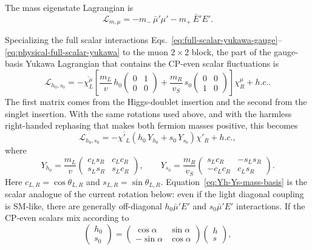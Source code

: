 \documentclass[onecolumn, aps, nofootinbib, prd, preprint, floats, floatfix, amsmath, amssymb, superscriptaddress, preprintnumbers]{revtex4-1}
\begin{document}
The mass eigenstate Lagrangian is
\begin{equation}
\mathcal{L}_{m,\mu}
=-m_-\,\bar\mu'\mu'-m_+\,\bar E' E'.
\end{equation}

Specializing the full scalar interactions Eqs.~\eqref{eq:full-scalar-yukawa-gauge}--\eqref{eq:physical-full-scalar-yukawa} to the muon $2\times2$ block, the part of the gauge-basis Yukawa Lagrangian that contains the CP-even scalar fluctuations is
\begin{equation}
\mathcal{L}_{h_0,s_0}
=-\overline{\chi_L^\mu}
\left[
\frac{m_L}{v}\,h_0
\begin{pmatrix}
0&1\\
0&0
\end{pmatrix}
+
\frac{m_R}{v_S}\,s_0
\begin{pmatrix}
0&0\\
1&0
\end{pmatrix}
\right]\chi_R^\mu
+h.c. .
\label{eq:gauge-basis-scalar-yukawa}
\end{equation}
The first matrix comes from the Higgs-doublet insertion and the second from the singlet insertion. With the same rotations used above, and with the harmless right-handed rephasing that makes both fermion masses positive, this becomes
\begin{equation}
\mathcal{L}_{h_0,s_0}
=-\overline{\chi'_L}
\left(h_0\,Y_{h_0}+s_0\,Y_{s_0}\right)\chi'_R+h.c.,
\label{eq:mass-basis-scalar-yukawa}
\end{equation}
where
\begin{equation}
Y_{h_0}=\frac{m_L}{v}
\begin{pmatrix}
c_Ls_R&c_Lc_R\\
s_Ls_R&s_Lc_R
\end{pmatrix},
\qquad
Y_{s_0}=\frac{m_R}{v_S}
\begin{pmatrix}
s_Lc_R&-s_Ls_R\\
-c_Lc_R&c_Ls_R
\end{pmatrix}.
\label{eq:Yh-Ys-mass-basis}
\end{equation}
Here $c_{L,R}=\cos\theta_{L,R}$ and $s_{L,R}=\sin\theta_{L,R}$. Equation~\eqref{eq:Yh-Ys-mass-basis} is the scalar analogue of the current rotation below: even if the light diagonal coupling is SM-like, there are generally off-diagonal $h_0\bar\mu'E'$ and $s_0\bar\mu'E'$ interactions. If the CP-even scalars mix according to
\begin{equation}
\begin{pmatrix}
h_0\\
s_0
\end{pmatrix}
=
\begin{pmatrix}
\cos\alpha&\sin\alpha\\
-\sin\alpha&\cos\alpha
\end{pmatrix}
\begin{pmatrix}
h\\
s
\end{pmatrix},
\end{equation}
\end{document}
